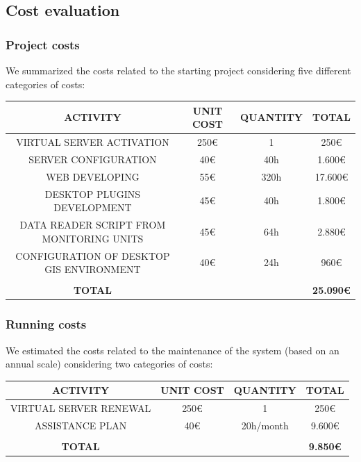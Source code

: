 \subsection{Cost evaluation}
\subsubsection{Project costs}
We summarized the costs related to the starting project considering five different categories of costs:
\begin{table}[H]
    \begin{tabular}{|c|c|c|c|}
    \hline
    \textbf{ACTIVITY} & \textbf{UNIT COST} & \textbf{QUANTITY} & \textbf{TOTAL} \\ \hline
    VIRTUAL SERVER ACTIVATION & 250€ & 1 & 250€ \\ \hline
    SERVER CONFIGURATION & 40€ & 40h & 1.600€ \\ \hline
    WEB DEVELOPING & 55€ & 320h & 17.600€ \\ \hline
    DESKTOP PLUGINS DEVELOPMENT & 45€ & 40h & 1.800€ \\ \hline
    DATA READER SCRIPT FROM MONITORING UNITS & 45€ & 64h & 2.880€ \\ \hline
    CONFIGURATION OF DESKTOP GIS ENVIRONMENT & 40€ & 24h & 960€ \\ \hline
     &  &  &  \\ \hline
    \textbf{TOTAL} &  &  & \textbf{25.090€} \\ \hline
    \end{tabular}
\end{table}

\subsubsection{Running costs}
We estimated the costs related to the maintenance of the system (based on an annual scale) considering two categories of costs:
\begin{table}[H]
    \begin{tabular}{|c|c|c|c|}
    \hline
    \textbf{ACTIVITY} & \textbf{UNIT COST} & \textbf{QUANTITY} & \textbf{TOTAL} \\ \hline
    VIRTUAL SERVER RENEWAL & 250€ & 1 & 250€ \\ \hline
    ASSISTANCE PLAN & 40€ & 20h/month & 9.600€ \\ \hline
     &  &  &  \\ \hline
    \textbf{TOTAL} &  &  & \textbf{9.850€} \\ \hline
    \end{tabular}
\end{table}
